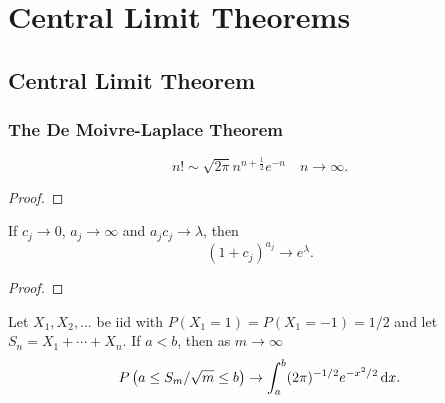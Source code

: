 \chapter{Central Limit Theorems}


\section{Central Limit Theorem}

\subsection{The De Moivre-Laplace Theorem}

\begin{lemma}\label{lem:stirling}
	\begin{equation}
		n! \sim \sqrt{2 \pi} n^{n+\frac{1}{2}} e^{-n}\quad n \rightarrow \infty.
	\end{equation}
\end{lemma}

\begin{proof}

\end{proof}

\begin{lemma}\label{lem:exp}
	If \(c_j\rightarrow 0\), \(a_j\rightarrow\infty\) and \(a_{j}c_{j}\rightarrow\lambda\), then
	\begin{equation}
		\left(1+c_j\right)^{a_j}\rightarrow e^\lambda.
	\end{equation}
\end{lemma}

\begin{proof}

\end{proof}

\begin{theorem}\label{thm:de-moivre-laplace}
	Let \(X_{1}, X_{2}, \ldots\) be iid with \(P\left(X_{1}=1\right)=P\left(X_{1}=-1\right)=1 / 2\) and let \(S_{n}=X_{1}+\cdots+X_{n}\). If \(a<b\), then as \(m \rightarrow \infty\)
	\begin{equation}
		P\left(a \leq S_{m} / \sqrt{m} \leq b\right) \rightarrow \int_{a}^{b}(2 \pi)^{-1 / 2} e^{-x^{2} / 2} \mathop{}\!\mathrm{d} x.
	\end{equation}
\end{theorem}

